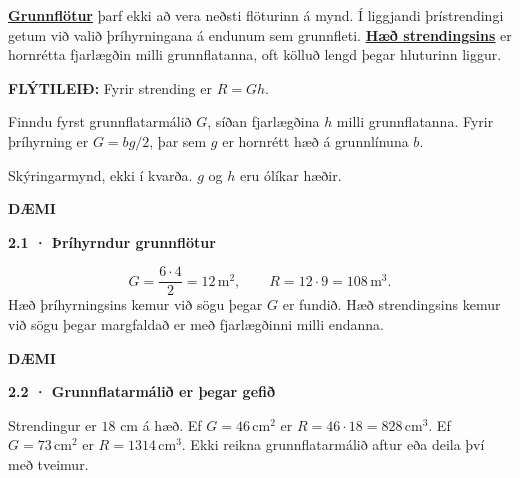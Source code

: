 \documentclass[12pt,letterpaper]{article}
\newcommand{\hugtak}[2]{\hyperref[hugtak:#1]{\textbf{#2}}}
\newenvironment{daemi}[2][lotaGreen]{\par\Needspace{7\baselineskip}
\noindent\colorbox{#1}{\strut\textbf{DÆMI}}\quad\textbf{#2}\par\nopagebreak
\begin{tcolorbox}[enhanced,breakable,colback=white,colframe=#1!35!white,
boxrule=.7pt,sharp corners,left=8pt,right=8pt,top=6pt,bottom=6pt]}{\end{tcolorbox}}
\newcommand{\eining}[1]{\,\mathrm{#1}}
\newcommand{\myndtexti}[1]{{\small #1}\par}
\begin{document}
\hugtak{grunnflotur}{Grunnflötur} þarf ekki að vera neðsti flöturinn á mynd. Í liggjandi þrístrendingi getum við valið þríhyrningana á endunum sem grunnfleti. \hugtak{haed}{Hæð strendingsins} er hornrétta fjarlægðin milli grunnflatanna, oft kölluð lengd þegar hluturinn liggur.
\begin{regla}\textbf{FLÝTILEIÐ:} Fyrir strending er \(R=G h\).\par
Finndu fyrst grunnflatarmálið \(G\), síðan fjarlægðina \(h\) milli grunnflatanna. Fyrir þríhyrning er \(G=bg/2\), þar sem \(g\) er hornrétt hæð á grunnlínuna \(b\).\end{regla}
\begin{center}
\par\myndtexti{Skýringarmynd, ekki í kvarða. $g$ og $h$ eru ólíkar hæðir.}
\end{center}
\begin{daemi}{2.1 · Þríhyrndur grunnflötur}
\[G=\frac{6\cdot4}{2}=12\eining{m^2},\qquad R=12\cdot9=108\eining{m^3}.\]
Hæð þríhyrningsins kemur við sögu þegar \(G\) er fundið. Hæð strendingsins kemur við sögu þegar margfaldað er með fjarlægðinni milli endanna.
\end{daemi}
\begin{daemi}[lotaCyan]{2.2 · Grunnflatarmálið er þegar gefið}
Strendingur er \(18\) cm á hæð. Ef \(G=46\eining{cm^2}\) er \(R=46\cdot18=828\eining{cm^3}\). Ef \(G=73\eining{cm^2}\) er \(R=1314\eining{cm^3}\). Ekki reikna grunnflatarmálið aftur eða deila því með tveimur.
\end{daemi}
\end{document}
